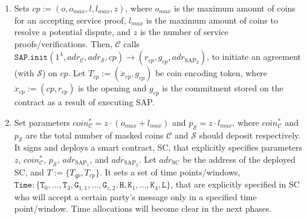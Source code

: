 \begin{enumerate}
\begin{enumerate}
%






\item  Sets  $cp:=(o,o_{\scriptscriptstyle max}, l,  l_{\scriptscriptstyle max},z)$, where $o_{\scriptscriptstyle max}$ is the maximum amount of coins  for an accepting service proof,  $l_{\scriptscriptstyle max}$  is the maximum amount of coins to resolve a potential dispute, and $z$ is the number of  service proofs/verifications. Then, $\mathcal C$ calls $\mathtt{SAP.init}(1^{\scriptscriptstyle\lambda}, adr_{\scriptscriptstyle\mathcal{C}}, adr_{\scriptscriptstyle\mathcal{S}},cp )\rightarrow(r_{\scriptscriptstyle cp},g_{\scriptscriptstyle cp},adr_{\scriptscriptstyle\text{SAP}_{\scriptscriptstyle 2}})$, to initiate an agreement (with $\mathcal{S}$) on $cp$. Let $T_{\scriptscriptstyle cp}:=(\ddot{x}_{\scriptscriptstyle cp},g_{\scriptscriptstyle cp})$ be coin encoding token,  where  $\ddot{x}_{\scriptscriptstyle cp}:=(cp,r_{\scriptscriptstyle cp})$ is the opening and $g_{\scriptscriptstyle cp}$ is the commitment stored on the contract as a result of executing   SAP.  





\item Set parameters  $coin^{\scriptscriptstyle *}_{\scriptscriptstyle\mathcal C}=z\cdot (o_{\scriptscriptstyle max}+l_{\scriptscriptstyle max})$ and $p_{\scriptscriptstyle\mathcal{S}}=z\cdot l_{\scriptscriptstyle max}$, where $coin^{\scriptscriptstyle *}_{\scriptscriptstyle\mathcal C}$ and $p_{\scriptscriptstyle\mathcal{S}}$ are   the total number of masked coins $\mathcal C$ and $\mathcal S$ should deposit respectively. It signs and deploys a smart contract, SC, that explicitly specifies  parameters $z$,  $coin^{\scriptscriptstyle *}_{\scriptscriptstyle\mathcal C}$, $p_{\scriptscriptstyle\mathcal{S}}$,  $adr_{\scriptscriptstyle\text{SAP}_{\scriptscriptstyle 1}}$, and $adr_{\scriptscriptstyle\text{SAP}_{\scriptscriptstyle 2}}$. Let $adr_{\scriptscriptstyle \text{SC}}$ be the address of the deployed SC, and $T:=\{T_{\scriptscriptstyle qp},T_{\scriptscriptstyle cp}\}$. It sets a set of time points/windows, $\texttt{Time}:\{ \texttt{T}_{\scriptscriptstyle 0},..., \texttt{T}_{\scriptscriptstyle 3},\texttt{G}_{\scriptscriptstyle 1,1},...,\texttt{G}_{\scriptscriptstyle z,2},\texttt{H}, \texttt{K}_{\scriptscriptstyle 1},...,\texttt{K}_{\scriptscriptstyle 4}, \texttt{L}\}$, that are explicitly specified in SC who will accept a certain party's message only in a specified  time point/window. Time allocations will become clear in the next phases. 



\end{enumerate}
\end{enumerate}
